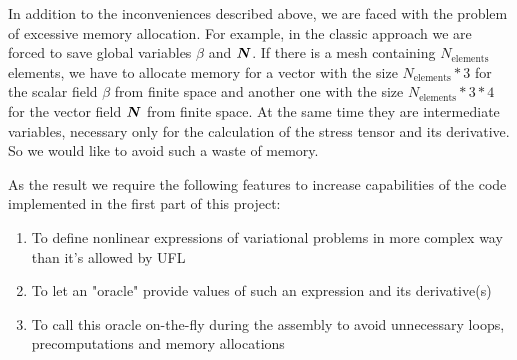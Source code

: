 \documentclass[12pt]{article}
\newcommand{\todounderline}[1]{\todo[inline, size=\scriptsize]{#1}}
\begin{document}

In addition to the inconveniences described above, we are faced with the problem of excessive memory allocation. For example, in the classic approach we are forced to save global variables $\beta$ and $\mbox{\boldmath $N$}$. If there is a mesh containing $N_\text{elements}$ elements, we have to allocate memory for a vector with the size $N_\text{elements}*3$ for the scalar field $\beta$ from  finite space and another one with the size $N_\text{elements}*3*4$ for the vector field $\mbox{\boldmath $N$}$ from  finite space. At the same time they are intermediate variables, necessary only for the calculation of the stress tensor and its derivative. So we would like to avoid such a waste of memory.




As the result we require the following features to increase capabilities of the code implemented in the first part of this project:
\begin{enumerate}
    \item To define nonlinear expressions of variational problems in more complex way than it's allowed by UFL
    \item To let an "oracle" provide values of such an expression and its derivative(s)
    \item To call this oracle on-the-fly during the assembly to avoid unnecessary loops, precomputations and memory allocations
\end{enumerate}
\end{document}
